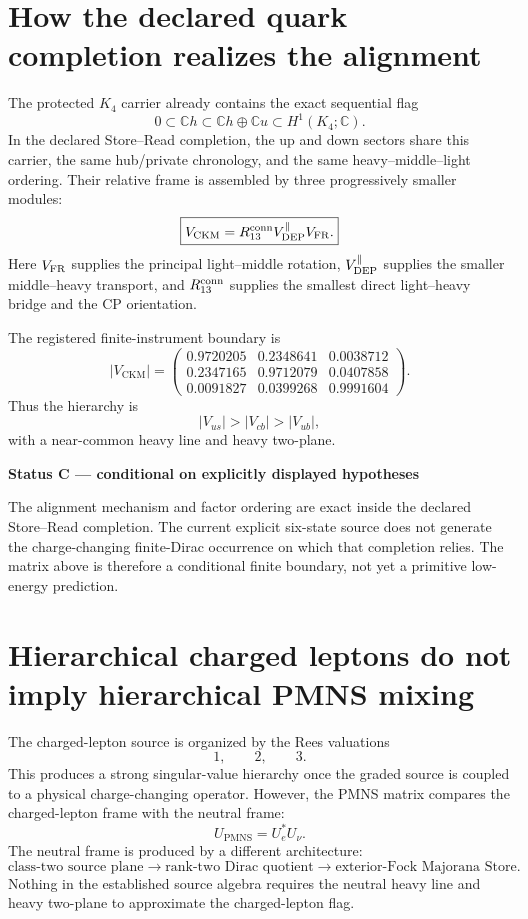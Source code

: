 \documentclass[11pt,oneside,openany]{book}
\numberwithin{equation}{chapter}
\theoremstyle{definition}
\theoremstyle{remark}
\newcommand{\C}{\mathbb C}
\newcommand{\abs}[1]{\lvert #1\rvert}
\newcommand{\CKM}{\mathrm{CKM}}
\newcommand{\PMNS}{\mathrm{PMNS}}
\newenvironment{statusbox}[2]{%
  \par\medskip\noindent
  \begin{center}\begin{minipage}{0.94\textwidth}
  \colorbox{#1!8}{\parbox{\dimexpr\linewidth-2\fboxsep\relax}{\textbf{#2}}}\par\smallskip
}{%
  \end{minipage}\end{center}\medskip
}
\newcommand{\Conditional}[1]{\begin{statusbox}{CondColor}{Status C --- conditional on explicitly displayed hypotheses}#1\end{statusbox}}
\begin{document}
\section{How the declared quark completion realizes the alignment}

The protected \(K_4\) carrier already contains the exact sequential flag
\[
 0\subset\C h\subset\C h\oplus\C u\subset H^1(K_4;\C).
\]
In the declared Store--Read completion, the up and down sectors share this
carrier, the same hub/private chronology, and the same heavy--middle--light
ordering.  Their relative frame is assembled by three progressively smaller
modules:
\[
 \boxed{
 V_{\CKM}
 =
 R_{13}^{\rm conn}
 V_{\rm DEP}^{\parallel}
 V_{\rm FR}.}
\]
Here \(V_{\rm FR}\) supplies the principal light--middle rotation,
\(V_{\rm DEP}^{\parallel}\) supplies the smaller middle--heavy transport,
and \(R_{13}^{\rm conn}\) supplies the smallest direct light--heavy bridge
and the CP orientation.

The registered finite-instrument boundary is
\[
 |V_{\CKM}|
 =
 \begin{pmatrix}
 0.9720205&0.2348641&0.0038712\\
 0.2347165&0.9712079&0.0407858\\
 0.0091827&0.0399268&0.9991604
 \end{pmatrix}.
\]
Thus the hierarchy is
\[
 \abs{V_{us}}
 >
 \abs{V_{cb}}
 >
 \abs{V_{ub}},
\]
with a near-common heavy line and heavy two-plane.

\Conditional{The alignment mechanism and factor ordering are exact inside
the declared Store--Read completion.  The current explicit six-state
source does not generate the charge-changing finite-Dirac occurrence on
which that completion relies.  The matrix above is therefore a conditional
finite boundary, not yet a primitive low-energy prediction.}

\section{Hierarchical charged leptons do not imply hierarchical PMNS mixing}

The charged-lepton source is organized by the Rees valuations
\[
 1,\qquad2,\qquad3.
\]
This produces a strong singular-value hierarchy once the graded source is
coupled to a physical charge-changing operator.  However, the PMNS matrix
compares the charged-lepton frame with the neutral frame:
\[
 U_{\PMNS}=U_e^*U_\nu.
\]
The neutral frame is produced by a different architecture:
\[
 \text{class-two source plane}
 \longrightarrow
 \text{rank-two Dirac quotient}
 \longrightarrow
 \text{exterior-Fock Majorana Store}.
\]
Nothing in the established source algebra requires the neutral heavy line
and heavy two-plane to approximate the charged-lepton flag.
\end{document}
